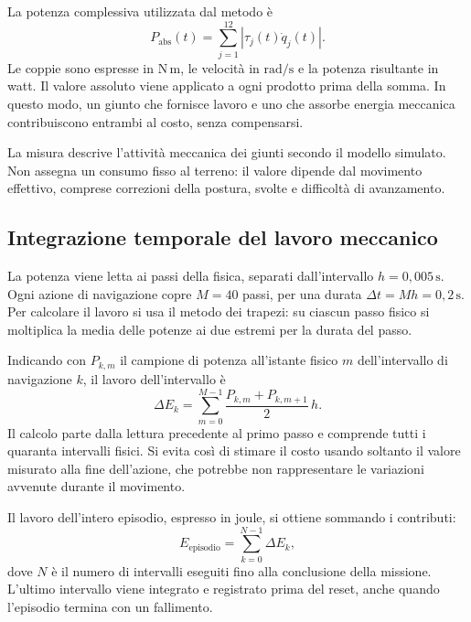 La potenza complessiva utilizzata dal metodo è
\begin{equation}
    P_{\mathrm{abs}}(t)=\sum_{j=1}^{12}
                    \left|\tau_j(t)\dot q_j(t)\right|.
    \label{eq:metodo-potenza-assoluta}
\end{equation}
Le coppie sono espresse in $\mathrm{N\,m}$, le velocità in $\mathrm{rad/s}$ e la potenza risultante in watt. Il valore assoluto viene applicato a ogni prodotto prima della somma. In questo modo, un giunto che fornisce lavoro e uno che assorbe energia meccanica contribuiscono entrambi al costo, senza compensarsi.

La misura descrive l'attività meccanica dei giunti secondo il modello simulato. Non assegna un consumo fisso al terreno: il valore dipende dal movimento effettivo, comprese correzioni della postura, svolte e difficoltà di avanzamento.

\subsection{Integrazione temporale del lavoro meccanico}

La potenza viene letta ai passi della fisica, separati dall'intervallo $h=0{,}005\,\mathrm{s}$. Ogni azione di navigazione copre $M=40$ passi, per una durata $\Delta t=Mh=0{,}2\,\mathrm{s}$. Per calcolare il lavoro si usa il metodo dei trapezi: su ciascun passo fisico si moltiplica la media delle potenze ai due estremi per la durata del passo.

Indicando con $P_{k,m}$ il campione di potenza all'istante fisico $m$ dell'intervallo di navigazione $k$, il lavoro dell'intervallo è
\begin{equation}
    \Delta E_k=\sum_{m=0}^{M-1}
                 \frac{P_{k,m}+P_{k,m+1}}{2}\,h.
    \label{eq:metodo-integrazione-trapezi}
\end{equation}
Il calcolo parte dalla lettura precedente al primo passo e comprende tutti i quaranta intervalli fisici. Si evita così di stimare il costo usando soltanto il valore misurato alla fine dell'azione, che potrebbe non rappresentare le variazioni avvenute durante il movimento.

Il lavoro dell'intero episodio, espresso in joule, si ottiene sommando i contributi:
\begin{equation}
    E_{\mathrm{episodio}}=\sum_{k=0}^{N-1}\Delta E_k,
    \label{eq:metodo-energia-episodio}
\end{equation}
dove $N$ è il numero di intervalli eseguiti fino alla conclusione della missione. L'ultimo intervallo viene integrato e registrato prima del reset, anche quando l'episodio termina con un fallimento.

